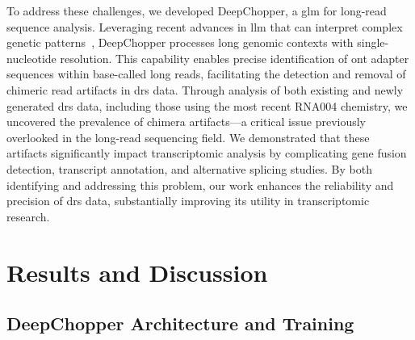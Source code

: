 \documentclass[pdflatex,sn-nature, lineno]{sn-jnl}%
\begin{document}
To address these challenges, we developed DeepChopper, a \gls{glm} for long-read sequence analysis.
Leveraging recent advances in \gls{llm} that can interpret complex genetic patterns~\cite{benegas2024genomic}, DeepChopper processes long genomic contexts with single-nucleotide resolution.
This capability enables precise identification of \gls{ont} adapter sequences within base-called long reads, facilitating the detection and removal of chimeric read artifacts in \gls{drs} data.
Through analysis of both existing and newly generated \gls{drs} data, including those using the most recent RNA004 chemistry, we uncovered the prevalence of chimera artifacts—a critical issue previously overlooked in the long-read sequencing field.
We demonstrated that these artifacts significantly impact transcriptomic analysis by complicating gene fusion detection, transcript annotation, and alternative splicing studies.
By both identifying and addressing this problem, our work enhances the reliability and precision of \gls{drs} data, substantially improving its utility in transcriptomic research.

\section{Results and Discussion}

\subsection{DeepChopper Architecture and Training}
\end{document}
